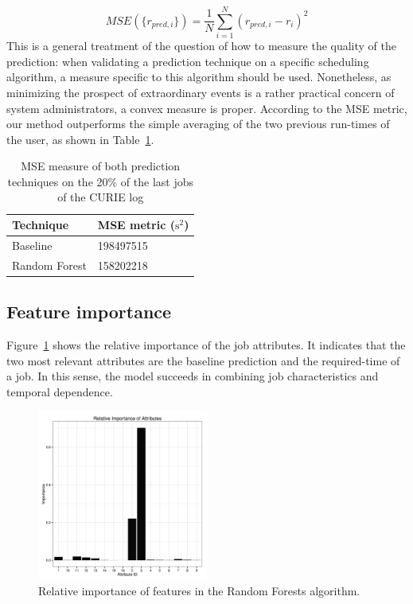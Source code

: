 \documentclass{article}
\begin{document}
  \[
    MSE(\{r_{pred,i}\})=\frac{1}{N}\sum_{i=1}^{N}  ({r_{pred,i}}-{r_{i}})^2
  \]
  This is a general treatment of the question of how to measure the quality of the prediction: when validating a prediction technique on a specific scheduling algorithm, a measure specific to this algorithm should be used. Nonetheless, as minimizing the prospect of extraordinary events is a rather practical concern of system administrators, a convex measure is proper.
  According to the MSE metric, our method outperforms the simple averaging of the two previous run-times of the user, as shown in Table~\ref{fig:lsq}.

  \begin{table}[ht]
    \centering
    \begin{tabular}{|l|l|}
      \hline
      Technique  & MSE metric ($\mbox{s}^2$)   \\
      \hline
      Baseline  & \num{198497515}\\
      \hline
      Random Forest & \num{158202218}\\
      \hline
    \end{tabular}
    \caption{MSE measure of both prediction techniques on the 20\% of the last jobs of the CURIE log}
      \label{fig:lsq}
    \end{table}

    \subsection{Feature importance}
    \label{sub:feature_importances}
    Figure~\ref{fig:importances} shows the relative importance of the job attributes. It indicates that the two most relevant attributes are the baseline prediction and the required-time of a job. In this sense, the model succeeds in combining job characteristics and temporal dependence.

    \begin{figure}[ht]
      \centering
      \includegraphics[width=0.5\textwidth]{interpretation.png}
      \caption{Relative importance of features in the Random Forests algorithm.}
      \label{fig:importances}
    \end{figure}
\end{document}
